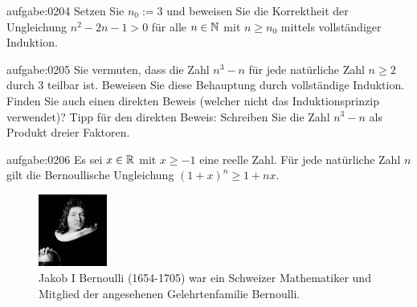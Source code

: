 \begin{aufgabe}{aufgabe:0204}
Setzen Sie $n_0 := 3$ und beweisen Sie die Korrektheit der Ungleichung $n^2 - 2n - 1 > 0$ für alle $n\in\mathbb{N}$ mit $n\geq n_0$ mittels vollständiger Induktion.
\end{aufgabe}

\begin{aufgabe}{aufgabe:0205}
Sie vermuten, dass die Zahl $n^3-n$ für jede natürliche Zahl $n\geq 2$ durch $3$ teilbar ist. Beweisen Sie diese Behauptung durch vollständige Induktion. Finden Sie auch einen direkten Beweis (welcher nicht das Induktionsprinzip verwendet)? Tipp für den direkten Beweis: Schreiben Sie die Zahl $n^3-n$ als Produkt dreier Faktoren.
\end{aufgabe}

\begin{aufgabe}{aufgabe:0206}
Es sei $x\in\mathbb{R}$ mit $x\geq -1$ eine reelle Zahl. Für jede natürliche Zahl $n$ gilt die Bernoullische Ungleichung $(1+x)^n\geq 1+nx$.
\begin{figure}[H]
    \centering
    \includegraphics[width=0.20\textwidth]{Bernoulli.jpg}
    \caption{Jakob I Bernoulli (1654-1705) war ein Schweizer Mathematiker und Mitglied der angesehenen Gelehrtenfamilie Bernoulli.}
    \label{fig:Bernoulli}
\end{figure}
\end{aufgabe}

